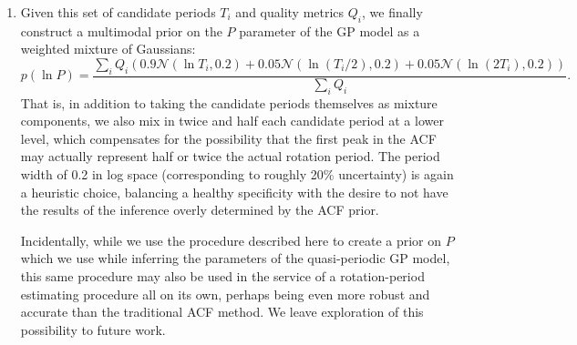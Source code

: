 \documentclass[useAMS, usenatbib, preprint, 12pt]{aastex}
\begin{document}
\begin{enumerate}
{\begin{enumerate}[(a)]
    \end{enumerate}
}

\item{Given this set of candidate periods $T_i$ and quality metrics $Q_i$,
we finally construct a multimodal prior on the $P$ parameter of the GP
model as a weighted mixture of Gaussians:
\begin{equation}
\label{eq:mixture}
p(\ln P) = \frac {\displaystyle \sum_i Q_i \left(0.9\mathcal N(\ln T_i, 0.2) + 
                                          0.05\mathcal N(\ln (T_i/2), 0.2) +
                                          0.05\mathcal N(\ln (2 T_i), 0.2) \right)}
                {\sum_i Q_i}.
\end{equation}
That is, in addition to taking the candidate periods themselves as mixture
components, we also mix in twice and half each candidate period at a lower level, 
which compensates for the possibility that the first peak in the ACF may actually 
represent half or twice the actual rotation period.  The period width of 0.2 in 
log space (corresponding to roughly 20\% uncertainty) is again a heuristic choice,
balancing a healthy specificity with the desire to not have the results of 
the inference overly determined by the ACF prior.
}

Incidentally, while we use the procedure described here to create a prior on 
$P$ which we use while inferring the parameters of the quasi-periodic GP model,
this same procedure may also be used in the service of a
rotation-period estimating procedure all on its own, perhaps being even more 
robust and accurate than the traditional ACF method.  We leave exploration of 
this possibility to future work.

\end{enumerate}






\end{document}

